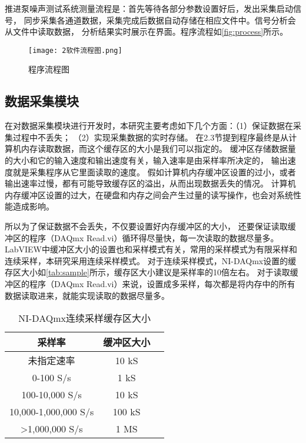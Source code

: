 推进泵噪声测试系统测量流程是：首先等待各部分参数设置好后，发出采集启动信号，
同步采集各通道数据，采集完成后数据自动存储在相应文件中。信号分析会从文件中读取数据，
分析结果实时展示在界面。程序流程如\autoref{fig:process}所示。
\begin{figure}[htbp]
    \centering
    \texttt{[image: 2软件流程图.png]}
    \caption{\label{fig:process}程序流程图}
\end{figure}

\begin{comment}
\subsection{系统设置模块}
软件界面的设置模块提供了测试系统各项参数设定，包括采集通道设置、采样参数设置、
传感器灵敏度设置、分析参数设置等。
\begin{figure}[htbp]
    \centering
    \texttt{[image: 2系统设置.png]}
    \caption{\label{fig:setting}系统设置}
\end{figure}
\end{comment}

\subsection{数据采集模块}
在对数据采集模块进行开发时，本研究主要考虑如下几个方面：（1）保证数据在采集过程中不丢失；
（2）实现采集数据的实时存储。
在2.3节提到程序最终是从计算机内存读取数据，而这个缓存区的大小是我们可以指定的。
缓冲区存储数据量的大小和它的输入速度和输出速度有关，输入速率是由采样率所决定的，
输出速度就是采集程序从它里面读取的速度。
假如计算机内存缓冲区设置的过小，或者输出速率过慢，都有可能导致缓存区的溢出，从而出现数据丢失的情况。
计算机内存缓冲区设置的过大，在硬盘和内存之间会产生过量的读写操作，也会对系统性能造成影响。

所以为了保证数据不会丢失，不仅要设置好内存缓冲区的大小，
还要保证读取缓冲区的程序（DAQmx Read.vi）循环得尽量快，每一次读取的数据尽量多。
LabVIEW中缓冲区大小的设置也和采样模式有关，常用的采样模式为有限采样和连续采样，本研究采用连续采样模式。
对于连续采样模式，NI-DAQmx设置的缓存区大小如\autoref{tab:sample}所示，缓存区大小建议是采样率的10倍左右。
对于读取缓冲区的程序（DAQmx Read.vi）来说，设置成多采样，每次都是将内存中的所有数据读取进来，就能实现读取的数据尽量多。
\begin{table}[htbp]
    \centering
    \caption{\label{tab:sample}NI-DAQmx连续采样缓存区大小}
    \begin{tabular}{ccc}
     \toprule
     采样率&缓冲区大小\\
     \midrule
     未指定速率&10 kS\\
     0-100 S/s&1 kS\\
     100-10,000 S/s&10 kS\\
     10,000-1,000,000 S/s&100 kS\\
     >1,000,000 S/s&1 MS\\
     \bottomrule
    \end{tabular}
\end{table}

